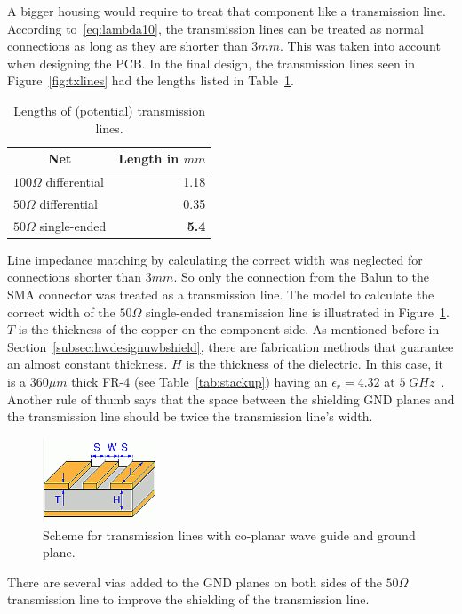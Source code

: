 \documentclass[journal,comsoc]{IEEEtran}
\begin{document}
A bigger housing would require to treat that component like a transmission line. 
According to~\eqref{eq:lambda10}, the transmission lines can be treated as normal connections as long as they are shorter than $3mm$.
This was taken into account when designing the PCB. 
In the final design, the transmission lines seen in Figure~\ref{fig:txlines} had the lengths listed in Table~\ref{tab:lengthstxlines}.
\begin{table}[t!]
	\centering
	\begin{tabular}{lr}
	\multicolumn{1}{c}{Net} & \multicolumn{1}{c}{Length in $mm$} \\ \hline
	$100 \Omega$ differential & 1.18 \\
	$50 \Omega$ differential & 0.35 \\
	$50 \Omega$ single-ended & \textbf{5.4}
	\end{tabular}
	\caption{Lengths of (potential) transmission lines.}
	\label{tab:lengthstxlines}
\end{table}
Line impedance matching by calculating the correct width was neglected for connections shorter than $3mm$.
So only the connection from the Balun to the SMA connector was treated as a transmission line.
The model to calculate the correct width of the $50 \Omega$ single-ended transmission line is illustrated in Figure~\ref{fig:pcbcalc}.
$T$ is the thickness of the copper on the component side.
As mentioned before in Section~\ref{subsec:hwdesignuwbshield}, there are fabrication methods that guarantee an almost constant thickness.
$H$ is the thickness of the dielectric. 
In this case, it is a $360\mu m$ thick FR-4 (see Table~\ref{tab:stackup}) having an $\epsilon_r = 4.32$ at $5 \; GHz$~\cite{fr4datasheet}.
Another rule of thumb says that the space between the shielding GND planes and the transmission line should be twice the transmission line's width.
\begin{figure}%
	\centering
	\includegraphics[width=0.3\textwidth]{Figures/pcbcalc}
	\caption{Scheme for transmission lines with co-planar wave guide and ground plane.}
	\label{fig:pcbcalc}
\end{figure}
There are several vias added to the GND planes on both sides of the $50\Omega$ transmission line to improve the shielding of the transmission line.
\end{document}

